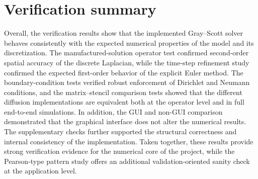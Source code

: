 \section{Verification summary}
\label{sec:verification_summary}

Overall, the verification results show that the implemented Gray--Scott solver behaves consistently with the expected numerical properties of the model and its discretization. The manufactured-solution operator test confirmed second-order spatial accuracy of the discrete Laplacian, while the time-step refinement study confirmed the expected first-order behavior of the explicit Euler method. The boundary-condition tests verified robust enforcement of Dirichlet and Neumann conditions, and the matrix--stencil comparison tests showed that the different diffusion implementations are equivalent both at the operator level and in full end-to-end simulations. In addition, the GUI and non-GUI comparison demonstrated that the graphical interface does not alter the numerical results. The supplementary checks further supported the structural correctness and internal consistency of the implementation. Taken together, these results provide strong verification evidence for the numerical core of the project, while the Pearson-type pattern study offers an additional validation-oriented sanity check at the application level.